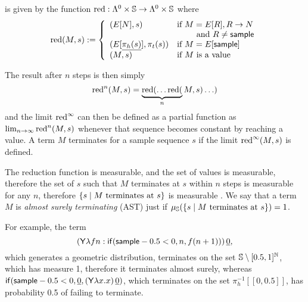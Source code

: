  is given by the function $\operatorname{red} : \Lambda^0 \times {\mathbb{S}} \to \Lambda^0 \times {\mathbb{S}}$ where
\begin{equation*}
\operatorname{red}(M,s) := \left\{
    \begin{array}{ll}
        (E[N],s) & \text{if } M = E[R], R \to N\\
        & \qquad \text{ and } R \neq \mathsf{sample} \\
        (E[\underline{\pi_h(s)}],\pi_t(s)) & \text{if } M = E[\mathsf{sample}] \\
        (M,s) & \text{if } M \text{ is a value}
    \end{array} \right .
\end{equation*}

The result after $n$ steps is then simply 
\[
\operatorname{red}^n(M,s) = \underbrace{\operatorname{red}(\ldots\operatorname{red}(}_n M,s)\ldots)
\] 
and the limit $\operatorname{red}^\infty$ can then be defined as a partial function as $\lim_{n \to \infty} \operatorname{red}^n(M,s)$ whenever that sequence becomes constant by reaching a value. A term $M$ terminates for a sample sequence $s$ if the limit $\operatorname{red}^\infty(M,s)$ is defined.

The reduction function is measurable, and the set of values is measurable, therefore the set of $s$ such that $M$ terminates at $s$ within $n$ steps is measurable for any $n$, therefore $\{s \mid \hbox{$M$ terminates at $s$}\}$ is measurable \cite{DBLP:conf/icfp/BorgstromLGS16,MakOP20a}. 
We say that a term $M$ is \emph{almost surely terminating} (AST) just if $\mu_{{\mathbb{S}}}(\{s \mid \hbox{$M$ terminates at $s$}\}) = 1$.

\iffalse
\lo{Alternatively, define the \emph{runtime of $M$} to be the random variable 
\[
T_M(s) := 
\begin{cases}
\min \set{n \mid \pi_0(\red^n(M, s)) \textrm{ is a value}} & \hbox{if $\red^\infty(M,s)$ is defined}\\
\infty & \hbox{otherwise}
\end{cases}
\]
Equivalently, we say that $M$ is \emph{almost surely terminating} (AST) if $T_M < \infty$ a.s.; 
and $M$ is \emph{positively almost surely terminating} (PAST) if $\expect{T_M} < \infty$.}
\fi
For example, the term 
\[
(\mathsf{Y} \lambda f n: \mathsf{if}(\mathsf{sample} - 0.5 < 0, n, f (n+1)) ) \, \underline{0},
\] 
which generates a geometric distribution, terminates on the set ${\mathbb{S}} \setminus [0.5,1]^\mathbb N$, which has measure 1, therefore it terminates almost surely, whereas 
\(
\mathsf{if}(\mathsf{sample} - 0.5 < 0, \underline 0, (\mathsf{Y} \lambda x. x) \, \underline 0)
\), 
which terminates on the set $\pi_h^{-1}[[0,0.5]]$, has probability 0.5 of failing to terminate.

